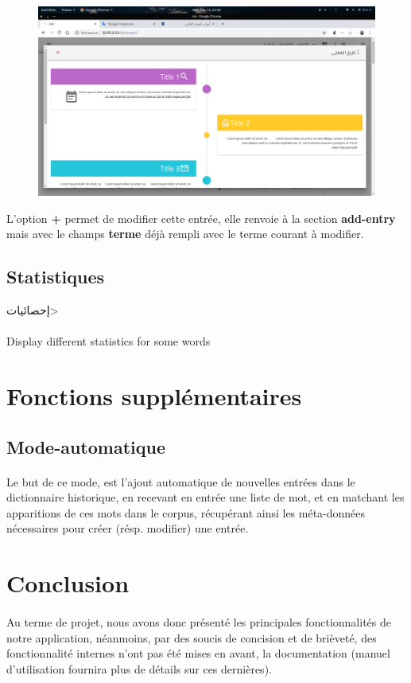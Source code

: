 \documentclass[]{report}
\begin{document}
			\begin{figure}[H]
				\centering
				\includegraphics[width=0.8\linewidth]{images/app/histotimeline.png}
			\end{figure}
			\par
			L'option \textbf{+} permet de modifier cette entrée, elle renvoie à la section \textbf{add-entry} mais avec le champs \textbf{terme} déjà rempli avec le terme courant à modifier.
			
		\subsection{Statistiques}
		\Large{\<إحصائيات>}
			\paragraph{}
			Display different statistics for some words
	\section{Fonctions supplémentaires}
		\subsection{Mode-automatique}
		\paragraph{}
		 Le but de ce mode, est l'ajout automatique de nouvelles entrées dans le dictionnaire historique, en recevant en entrée une liste de mot, et en matchant les apparitions de ces mots dans le corpus, récupérant ainsi les méta-données nécessaires pour 
		 créer (résp. modifier) une entrée. 
	\section{Conclusion}
		\paragraph{}
		Au terme de projet, nous avons donc présenté les principales fonctionnalités de notre application, néanmoins, par des soucis de concision et de brièveté, des fonctionnalité internes n'ont pas été mises en avant, la documentation (manuel d'utilisation fournira plus de détails sur ces dernières).
\end{document}
